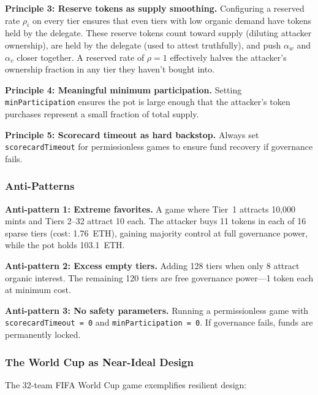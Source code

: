 \documentclass[11pt,a4paper]{article}
\begin{document}
\textbf{Principle 3: Reserve tokens as supply smoothing.} Configuring a reserved rate $\rho_i$ on every tier ensures that even tiers with low organic demand have tokens held by the delegate. These reserve tokens count toward supply (diluting attacker ownership), are held by the delegate (used to attest truthfully), and push $\alpha_w$ and $\alpha_v$ closer together. A reserved rate of $\rho = 1$ effectively halves the attacker's ownership fraction in any tier they haven't bought into.

\textbf{Principle 4: Meaningful minimum participation.} Setting \texttt{minParticipation} ensures the pot is large enough that the attacker's token purchases represent a small fraction of total supply.

\textbf{Principle 5: Scorecard timeout as hard backstop.} Always set \texttt{scorecardTimeout} for permissionless games to ensure fund recovery if governance fails.

\subsubsection{Anti-Patterns}

\textbf{Anti-pattern 1: Extreme favorites.} A game where Tier~1 attracts 10,000 mints and Tiers 2--32 attract 10 each. The attacker buys 11 tokens in each of 16 sparse tiers (cost: 1.76~ETH), gaining majority control at full governance power, while the pot holds 103.1~ETH.

\textbf{Anti-pattern 2: Excess empty tiers.} Adding 128 tiers when only 8 attract organic interest. The remaining 120 tiers are free governance power---1 token each at minimum cost.

\textbf{Anti-pattern 3: No safety parameters.} Running a permissionless game with \texttt{scorecardTimeout = 0} and \texttt{minParticipation = 0}. If governance fails, funds are permanently locked.

\subsubsection{The World Cup as Near-Ideal Design}

The 32-team FIFA World Cup game exemplifies resilient design:
\end{document}
